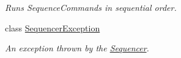 \begin{DoxyCompactItemize}
\begin{DoxyCompactList}\small\item\em Runs Sequence\-Commands in sequential order. \end{DoxyCompactList}\item 
class \hyperlink{classstrange_1_1extensions_1_1sequencer_1_1impl_1_1_sequencer_exception}{Sequencer\-Exception}
\begin{DoxyCompactList}\small\item\em An exception thrown by the \hyperlink{classstrange_1_1extensions_1_1sequencer_1_1impl_1_1_sequencer}{Sequencer}. \end{DoxyCompactList}\end{DoxyCompactItemize}
